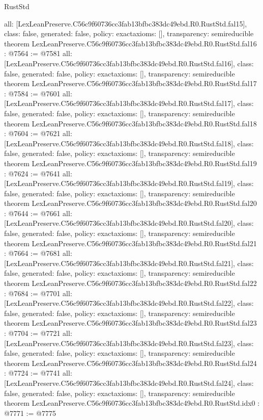 \begin{lexlean}{RustStd}
\begin{coremodule}
{  all: [LexLeanPreserve.C56c9f60736cc3fab13bfbc383dc49ebd.R0.RustStd.fal15],
  class: false,
  generated: false,
  policy: exact{axioms: []},
  transparency: semireducible
}
theorem LexLeanPreserve.C56c9f60736cc3fab13bfbc383dc49ebd.R0.RustStd.fal16 : @7564 := @7581 {
  all: [LexLeanPreserve.C56c9f60736cc3fab13bfbc383dc49ebd.R0.RustStd.fal16],
  class: false,
  generated: false,
  policy: exact{axioms: []},
  transparency: semireducible
}
theorem LexLeanPreserve.C56c9f60736cc3fab13bfbc383dc49ebd.R0.RustStd.fal17 : @7584 := @7601 {
  all: [LexLeanPreserve.C56c9f60736cc3fab13bfbc383dc49ebd.R0.RustStd.fal17],
  class: false,
  generated: false,
  policy: exact{axioms: []},
  transparency: semireducible
}
theorem LexLeanPreserve.C56c9f60736cc3fab13bfbc383dc49ebd.R0.RustStd.fal18 : @7604 := @7621 {
  all: [LexLeanPreserve.C56c9f60736cc3fab13bfbc383dc49ebd.R0.RustStd.fal18],
  class: false,
  generated: false,
  policy: exact{axioms: []},
  transparency: semireducible
}
theorem LexLeanPreserve.C56c9f60736cc3fab13bfbc383dc49ebd.R0.RustStd.fal19 : @7624 := @7641 {
  all: [LexLeanPreserve.C56c9f60736cc3fab13bfbc383dc49ebd.R0.RustStd.fal19],
  class: false,
  generated: false,
  policy: exact{axioms: []},
  transparency: semireducible
}
theorem LexLeanPreserve.C56c9f60736cc3fab13bfbc383dc49ebd.R0.RustStd.fal20 : @7644 := @7661 {
  all: [LexLeanPreserve.C56c9f60736cc3fab13bfbc383dc49ebd.R0.RustStd.fal20],
  class: false,
  generated: false,
  policy: exact{axioms: []},
  transparency: semireducible
}
theorem LexLeanPreserve.C56c9f60736cc3fab13bfbc383dc49ebd.R0.RustStd.fal21 : @7664 := @7681 {
  all: [LexLeanPreserve.C56c9f60736cc3fab13bfbc383dc49ebd.R0.RustStd.fal21],
  class: false,
  generated: false,
  policy: exact{axioms: []},
  transparency: semireducible
}
theorem LexLeanPreserve.C56c9f60736cc3fab13bfbc383dc49ebd.R0.RustStd.fal22 : @7684 := @7701 {
  all: [LexLeanPreserve.C56c9f60736cc3fab13bfbc383dc49ebd.R0.RustStd.fal22],
  class: false,
  generated: false,
  policy: exact{axioms: []},
  transparency: semireducible
}
theorem LexLeanPreserve.C56c9f60736cc3fab13bfbc383dc49ebd.R0.RustStd.fal23 : @7704 := @7721 {
  all: [LexLeanPreserve.C56c9f60736cc3fab13bfbc383dc49ebd.R0.RustStd.fal23],
  class: false,
  generated: false,
  policy: exact{axioms: []},
  transparency: semireducible
}
theorem LexLeanPreserve.C56c9f60736cc3fab13bfbc383dc49ebd.R0.RustStd.fal24 : @7724 := @7741 {
  all: [LexLeanPreserve.C56c9f60736cc3fab13bfbc383dc49ebd.R0.RustStd.fal24],
  class: false,
  generated: false,
  policy: exact{axioms: []},
  transparency: semireducible
}
theorem LexLeanPreserve.C56c9f60736cc3fab13bfbc383dc49ebd.R0.RustStd.idx0 : @7771 := @7775 {
}
\end{coremodule}
\end{lexlean}
